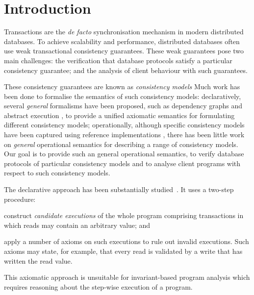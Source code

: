 \section{Introduction}
\label{sec:intro}

Transactions are the \emph{de facto} synchronisation mechanism in
modern distributed databases.  To achieve scalability and performance,
distributed databases often use weak transactional consistency
guarantees. These weak guarantees pose two main challenges: the
verification that database protocols satisfy a particular consistency
guarantee; and the analysis of client behaviour with such guarantees.

These consistency guarantees are known as \emph{consistency models}
Much work has been done to formalise the semantics of such consistency models:
declaratively, several \emph{general} formalisms have been proposed, such as
dependency graphs \cite{adya} and abstract
execution \cite{ev_transactions}, to provide a unified axiomatic semantics for
formulating different consistency models;
operationally, although {specific} consistency models have been captured 
using reference implementations \cite{si,PSI,PSI-RA,cops,ramp,bayou},
there has been little work on \emph{general} operational semantics
for describing a range of consistency models.
Our goal is to provide such an general operational semantics, 
to verify database protocols of particular consistency models 
and to analyse client programs with respect to such consistency models.  

The declarative approach has been substantially
studied~\cite{adya,ev_transactions,framework-concur,laws}. 
It uses  a two-step procedure:
\begin{enumerate*}
\item construct {\em candidate executions} of the whole program comprising
transactions in which reads may contain an arbitrary value; and 
\item apply a number of axioms on such executions to rule out invalid executions. 
Such axioms may state, for example, that every read is
validated by a write that has written the read value. 
\end{enumerate*}
This axiomatic approach is unsuitable for invariant-based program analysis 
which requires reasoning about the step-wise execution of a program. 

